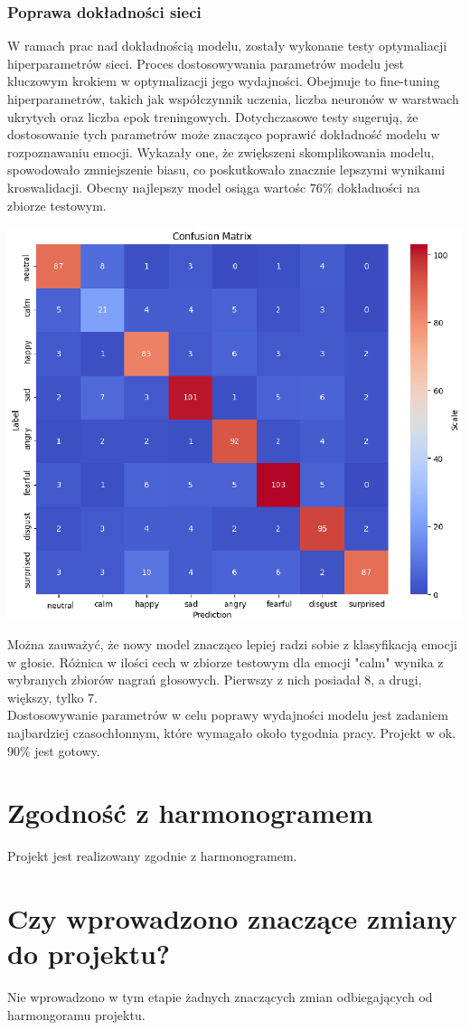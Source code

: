 \documentclass[12pt,titlepage]{article}
\begin{document}
\subsubsection{Poprawa dokładności sieci}
W ramach prac nad dokładnością modelu, zostały wykonane testy optymaliacji hiperparametrów sieci. Proces dostosowywania parametrów modelu jest kluczowym krokiem w optymalizacji jego wydajności. Obejmuje to fine-tuning hiperparametrów, takich jak współczynnik uczenia, liczba neuronów w warstwach ukrytych oraz liczba epok treningowych. Dotychczasowe testy sugerują, że dostosowanie tych parametrów może znacząco poprawić dokładność modelu w rozpoznawaniu emocji. Wykazały one, że zwiększeni skomplikowania modelu, spowodowało zmniejszenie biasu, co poskutkowało znacznie lepszymi wynikami kroswalidacji. Obecny najlepszy model osiąga wartośc 76\% dokładności na zbiorze testowym.
\begin{center}
    \includegraphics[width=\textwidth]{img/conf_matrix.png}
\end{center}
Można zauważyć, że nowy model znacząco lepiej radzi sobie z klasyfikacją emocji w głosie. Różnica w ilości cech w zbiorze testowym dla emocji "calm" wynika z wybranych zbiorów nagrań głosowych. Pierwszy z nich posiadał 8, a drugi, większy, tylko 7.\\ Dostosowywanie parametrów w celu poprawy wydajności modelu jest zadaniem najbardziej czasochłonnym, które wymagało około tygodnia pracy. 
Projekt w ok. 90\% jest gotowy.

\section{Zgodność z harmonogramem}
Projekt jest realizowany zgodnie z harmonogramem. 
\section{Czy wprowadzono znaczące zmiany do projektu?}
Nie wprowadzono w tym etapie żadnych znaczących zmian odbiegających od harmongoramu projektu.
\end{document}
